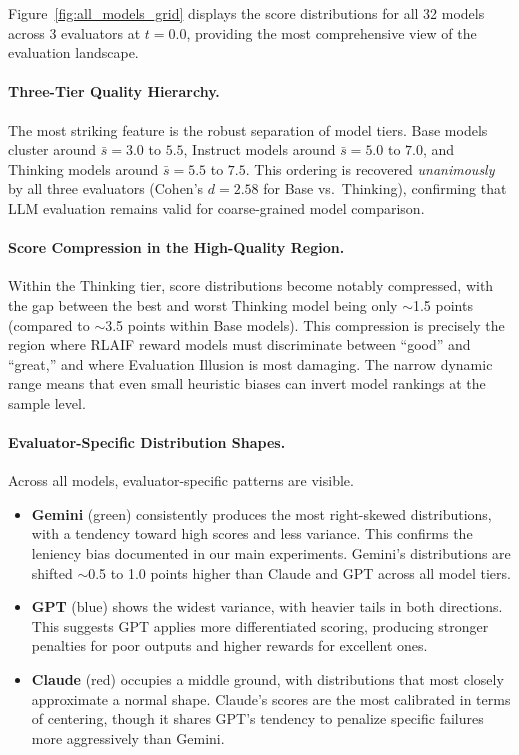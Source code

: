 \documentclass{article}
\begin{document}
Figure~\ref{fig:all_models_grid} displays the score distributions for all 32 models across 3 evaluators at $t{=}0.0$, providing the most comprehensive view of the evaluation landscape.

\paragraph{Three-Tier Quality Hierarchy.} The most striking feature is the robust separation of model tiers. Base models cluster around $\bar{s} = 3.0$ to $5.5$, Instruct models around $\bar{s} = 5.0$ to $7.0$, and Thinking models around $\bar{s} = 5.5$ to $7.5$. This ordering is recovered \textit{unanimously} by all three evaluators (Cohen's $d = 2.58$ for Base vs.\ Thinking), confirming that LLM evaluation remains valid for coarse-grained model comparison.

\paragraph{Score Compression in the High-Quality Region.} Within the Thinking tier, score distributions become notably compressed, with the gap between the best and worst Thinking model being only $\sim$1.5 points (compared to $\sim$3.5 points within Base models). This compression is precisely the region where RLAIF reward models must discriminate between ``good'' and ``great,'' and where Evaluation Illusion is most damaging. The narrow dynamic range means that even small heuristic biases can invert model rankings at the sample level.

\paragraph{Evaluator-Specific Distribution Shapes.} Across all models, evaluator-specific patterns are visible.
\begin{itemize}
    \item \textbf{Gemini} (green) consistently produces the most right-skewed distributions, with a tendency toward high scores and less variance. This confirms the leniency bias documented in our main experiments. Gemini's distributions are shifted $\sim$0.5 to 1.0 points higher than Claude and GPT across all model tiers.
    \item \textbf{GPT} (blue) shows the widest variance, with heavier tails in both directions. This suggests GPT applies more differentiated scoring, producing stronger penalties for poor outputs and higher rewards for excellent ones.
    \item \textbf{Claude} (red) occupies a middle ground, with distributions that most closely approximate a normal shape. Claude's scores are the most calibrated in terms of centering, though it shares GPT's tendency to penalize specific failures more aggressively than Gemini.
\end{itemize}
\end{document}
